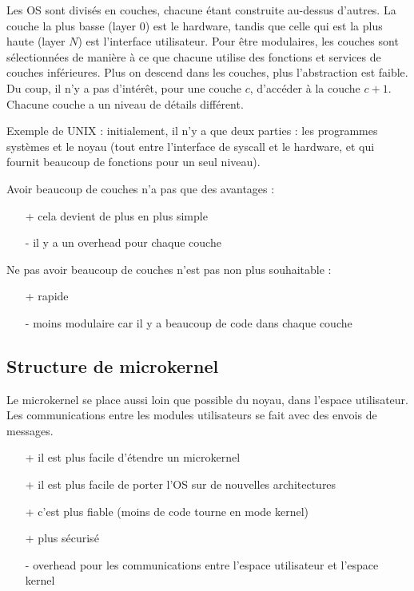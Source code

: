 	
	Les OS sont divisés en couches, chacune étant construite au-dessus d'autres. La couche la plus basse (layer 0) est le hardware, tandis que celle qui est la plus haute (layer $N$) est l'interface utilisateur. Pour être modulaires, les couches sont sélectionnées de manière à ce que chacune utilise des fonctions et services de couches inférieures. Plus on descend dans les couches, plus l'abstraction est faible. Du coup, il n'y a pas d'intérêt, pour une couche $c$, d'accéder à la couche $c + 1$. Chacune couche a un niveau de détails différent.
	
	Exemple de UNIX : initialement, il n'y a que deux parties : les programmes systèmes et le noyau (tout entre l'interface de syscall et le hardware, et qui fournit beaucoup de fonctions pour un seul niveau).
	
	
	Avoir beaucoup de couches n'a pas que des avantages :
	
	\begin{itemize}
		\item[+] cela devient de plus en plus simple
		\item[-] il y a un overhead pour chaque couche
	\end{itemize}
	
	Ne pas avoir beaucoup de couches n'est pas non plus souhaitable :
	
	\begin{itemize}
		\item[+] rapide
		\item[-] moins modulaire car il y a beaucoup de code dans chaque couche
	\end{itemize}
	
	
	
	\subsection{Structure de microkernel}
	
	Le microkernel se place aussi loin que possible du noyau, dans l'espace utilisateur. Les communications entre les modules utilisateurs se fait avec des envois de messages.
	
	\begin{itemize}
		\item[+] il est plus facile d'étendre un microkernel
		\item[+] il est plus facile de porter l'OS sur de nouvelles architectures
		\item[+] c'est plus fiable (moins de code tourne en mode kernel)
		\item[+] plus sécurisé
		\item[-] overhead pour les communications entre l'espace utilisateur et l'espace kernel
	\end{itemize}
	
